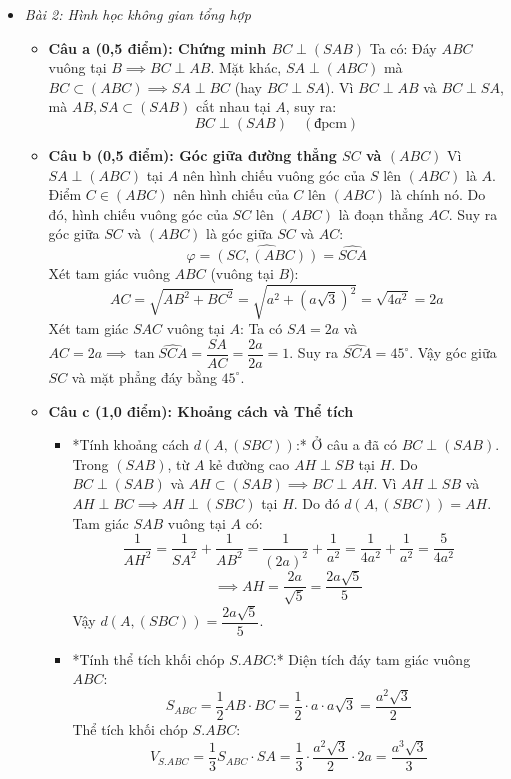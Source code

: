 \documentclass[12pt, a4paper]{article}
\begin{document}
\begin{itemize}[leftmargin=1.2cm]
\begin{itemize}[leftmargin=0.6cm]
        \item \textit{Bài 2: Hình học không gian tổng hợp}
        \begin{itemize}
            \item \textbf{Câu a (0,5 điểm): Chứng minh $BC \perp (SAB)$}
            Ta có: Đáy $ABC$ vuông tại $B \implies BC \perp AB$.
            Mặt khác, $SA \perp (ABC)$ mà $BC \subset (ABC) \implies SA \perp BC$ (hay $BC \perp SA$).
            Vì $BC \perp AB$ và $BC \perp SA$, mà $AB, SA \subset (SAB)$ cắt nhau tại $A$, suy ra:
            $$BC \perp (SAB) \quad (\text{đpcm})$$

            \item \textbf{Câu b (0,5 điểm): Góc giữa đường thẳng $SC$ và $(ABC)$}
            Vì $SA \perp (ABC)$ tại $A$ nên hình chiếu vuông góc của $S$ lên $(ABC)$ là $A$.
            Điểm $C \in (ABC)$ nên hình chiếu của $C$ lên $(ABC)$ là chính nó.
            Do đó, hình chiếu vuông góc của $SC$ lên $(ABC)$ là đoạn thẳng $AC$.
            Suy ra góc giữa $SC$ và $(ABC)$ là góc giữa $SC$ và $AC$:
            $$\varphi = \widehat{(SC, (ABC))} = \widehat{SCA}$$
            Xét tam giác vuông $ABC$ (vuông tại $B$):
            $$AC = \sqrt{AB^2 + BC^2} = \sqrt{a^2 + (a\sqrt{3})^2} = \sqrt{4a^2} = 2a$$
            Xét tam giác $SAC$ vuông tại $A$:
            Ta có $SA = 2a$ và $AC = 2a \implies \tan \widehat{SCA} = \dfrac{SA}{AC} = \dfrac{2a}{2a} = 1$.
            Suy ra $\widehat{SCA} = 45^\circ$.
            Vậy góc giữa $SC$ và mặt phẳng đáy bằng $45^\circ$.

            \item \textbf{Câu c (1,0 điểm): Khoảng cách và Thể tích}
            \begin{itemize}
                \item *Tính khoảng cách $d(A, (SBC))$:*
                Ở câu a đã có $BC \perp (SAB)$. Trong $(SAB)$, từ $A$ kẻ đường cao $AH \perp SB$ tại $H$.
                Do $BC \perp (SAB)$ và $AH \subset (SAB) \implies BC \perp AH$.
                Vì $AH \perp SB$ và $AH \perp BC \implies AH \perp (SBC)$ tại $H$.
                Do đó $d(A, (SBC)) = AH$.
                Tam giác $SAB$ vuông tại $A$ có:
                $$\dfrac{1}{AH^2} = \dfrac{1}{SA^2} + \dfrac{1}{AB^2} = \dfrac{1}{(2a)^2} + \dfrac{1}{a^2} = \dfrac{1}{4a^2} + \dfrac{1}{a^2} = \dfrac{5}{4a^2}$$
                $$\implies AH = \dfrac{2a}{\sqrt{5}} = \dfrac{2a\sqrt{5}}{5}$$
                Vậy $d(A, (SBC)) = \dfrac{2a\sqrt{5}}{5}$.
                \item *Tính thể tích khối chóp $S.ABC$:*
                Diện tích đáy tam giác vuông $ABC$:
                $$S_{ABC} = \dfrac{1}{2} AB \cdot BC = \dfrac{1}{2} \cdot a \cdot a\sqrt{3} = \dfrac{a^2\sqrt{3}}{2}$$
                Thể tích khối chóp $S.ABC$:
                $$V_{S.ABC} = \dfrac{1}{3} S_{ABC} \cdot SA = \dfrac{1}{3} \cdot \dfrac{a^2\sqrt{3}}{2} \cdot 2a = \dfrac{a^3\sqrt{3}}{3}$$
            \end{itemize}
        \end{itemize}
    \end{itemize}


\end{itemize}
\end{document}
